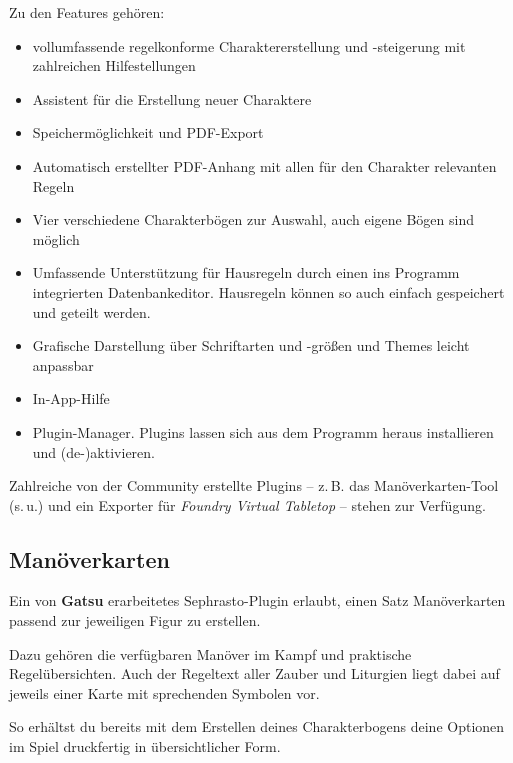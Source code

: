 Zu den Features gehören:
\begin{itemize}
	\item vollumfassende regelkonforme Charaktererstellung und -steigerung mit zahlreichen Hilfestellungen
	\item 	Assistent für die Erstellung neuer Charaktere
	\item	Speichermöglichkeit und PDF-Export
	\item	Automatisch erstellter PDF-Anhang mit allen für den Charakter relevanten Regeln
	\item	Vier verschiedene Charakterbögen zur Auswahl, auch eigene Bögen sind möglich
	\item	Umfassende Unterstützung für Hausregeln durch einen ins Programm integrierten Datenbankeditor. Hausregeln können so auch einfach gespeichert und geteilt werden.
	\item	Grafische Darstellung über Schriftarten und -größen und Themes leicht anpassbar
	\item	In-App-Hilfe
	\item	Plugin-Manager. Plugins lassen sich aus dem Programm heraus installieren und (de-)aktivieren.
\end{itemize}

Zahlreiche von der Community erstellte Plugins -- z.\,B. das Manöverkarten-Tool (s.\,u.) und ein Exporter für \emph{Foundry Virtual Tabletop} -- stehen zur Verfügung.


\subsection*{Manöverkarten}
Ein von \textbf{Gatsu} erarbeitetes Sephrasto-Plugin erlaubt, einen Satz Manöverkarten passend zur jeweiligen Figur zu erstellen.

Dazu gehören die verfügbaren Manöver im Kampf und praktische Regelübersichten.
Auch der Regeltext aller Zauber und Liturgien liegt dabei auf jeweils einer Karte mit sprechenden Symbolen vor.

So erhältst du bereits mit dem Erstellen deines Charakterbogens deine Optionen im Spiel druckfertig in übersichtlicher Form.



%
%	
%	
%	



